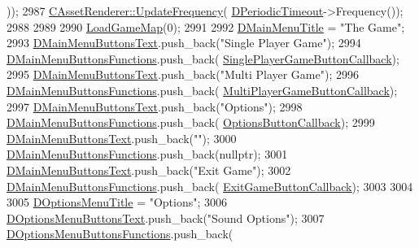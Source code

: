 \begin{DoxyCode}
      ));
2987     \hyperlink{classCAssetRenderer_a06e45891dcbc0a88570c537a4d6906c8}{CAssetRenderer::UpdateFrequency}(
      \hyperlink{classCApplicationData_a0265cb7aba9f099faed2a1c8ee588d33}{DPeriodicTimeout}->Frequency());
2988 
2989     
2990     \hyperlink{classCApplicationData_a89af0c7917be766575720e5ac79c8d2d}{LoadGameMap}(0);
2991     
2992     \hyperlink{classCApplicationData_a2b0ca036562d2af6eca3ee4a6e2330f8}{DMainMenuTitle} = \textcolor{stringliteral}{"The Game"};
2993     \hyperlink{classCApplicationData_a1e1c9f4434847c50210c0b36ff475f78}{DMainMenuButtonsText}.push\_back(\textcolor{stringliteral}{"Single Player Game"});
2994     \hyperlink{classCApplicationData_a9f9c3de6840e902711636257640a8e91}{DMainMenuButtonsFunctions}.push\_back(
      \hyperlink{classCApplicationData_a239a28599cbb6762c21306a4a03c6202}{SinglePlayerGameButtonCallback});
2995     \hyperlink{classCApplicationData_a1e1c9f4434847c50210c0b36ff475f78}{DMainMenuButtonsText}.push\_back(\textcolor{stringliteral}{"Multi Player Game"});
2996     \hyperlink{classCApplicationData_a9f9c3de6840e902711636257640a8e91}{DMainMenuButtonsFunctions}.push\_back(
      \hyperlink{classCApplicationData_afabb120415cdadf67edca20c67e8c6fa}{MultiPlayerGameButtonCallback});
2997     \hyperlink{classCApplicationData_a1e1c9f4434847c50210c0b36ff475f78}{DMainMenuButtonsText}.push\_back(\textcolor{stringliteral}{"Options"});
2998     \hyperlink{classCApplicationData_a9f9c3de6840e902711636257640a8e91}{DMainMenuButtonsFunctions}.push\_back(
      \hyperlink{classCApplicationData_a3647cf78eb59689b901d4204c81555b4}{OptionsButtonCallback});
2999     \hyperlink{classCApplicationData_a1e1c9f4434847c50210c0b36ff475f78}{DMainMenuButtonsText}.push\_back(\textcolor{stringliteral}{""});
3000     \hyperlink{classCApplicationData_a9f9c3de6840e902711636257640a8e91}{DMainMenuButtonsFunctions}.push\_back(\textcolor{keyword}{nullptr});
3001     \hyperlink{classCApplicationData_a1e1c9f4434847c50210c0b36ff475f78}{DMainMenuButtonsText}.push\_back(\textcolor{stringliteral}{"Exit Game"});
3002     \hyperlink{classCApplicationData_a9f9c3de6840e902711636257640a8e91}{DMainMenuButtonsFunctions}.push\_back(
      \hyperlink{classCApplicationData_a6a2c934fee258ccdb2a4a70c075f79fd}{ExitGameButtonCallback});
3003     
3004         
3005     \hyperlink{classCApplicationData_a1e73e21e92eb68c1cfc0c4bcae8196df}{DOptionsMenuTitle} = \textcolor{stringliteral}{"Options"};
3006     \hyperlink{classCApplicationData_aa9201da5408887973cb56fb1671ad6f8}{DOptionsMenuButtonsText}.push\_back(\textcolor{stringliteral}{"Sound Options"});
3007     \hyperlink{classCApplicationData_a4c9516d20be17a9c9d5c1119736037e5}{DOptionsMenuButtonsFunctions}.push\_back(

\end{DoxyCode}
